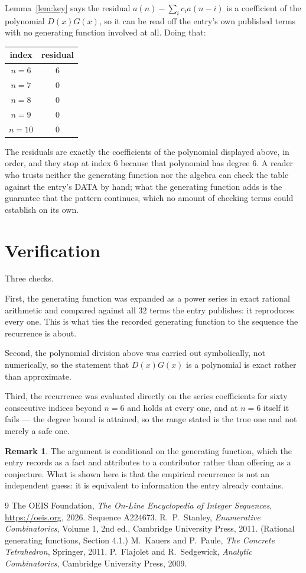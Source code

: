 \documentclass[11pt,a4paper]{article}
\theoremstyle{plain}
\theoremstyle{definition}
\newtheorem{remark}[theorem]{Remark}
\begin{document}
Lemma~\ref{lem:key} says the residual $a(n)-\sum_ic_ia(n-i)$ is a coefficient of the
polynomial $D(x)G(x)$, so it can be read off the entry's own published terms with no
generating function involved at all. Doing that:
\begin{center}
\begin{tabular}{cc}
index & residual \\ \hline
$n=6$ & $6$ \\
$n=7$ & $0$ \\
$n=8$ & $0$ \\
$n=9$ & $0$ \\
$n=10$ & $0$
\end{tabular}
\end{center}
The residuals are exactly the coefficients of the polynomial displayed above, in order, and
they stop at index $6$ because that polynomial has degree $6$. A reader who trusts
neither the generating function nor the algebra can check the table against the entry's DATA
by hand; what the generating function adds is the guarantee that the pattern continues, which
no amount of checking terms could establish on its own.

\section{Verification}

Three checks.

First, the generating function was expanded as a power series in exact rational arithmetic and
compared against all $32$ terms the entry publishes: it reproduces every one. This is
what ties the recorded generating function to the sequence the recurrence is about.

Second, the polynomial division above was carried out symbolically, not numerically, so the
statement that $D(x)G(x)$ is a polynomial is exact rather than approximate.

Third, the recurrence was evaluated directly on the series coefficients for sixty consecutive
indices beyond $n=6$ and holds at every one, and at $n=6$ itself it fails --- the
degree bound is attained, so the range stated is the true one and not merely a safe one.

\begin{remark}
The argument is conditional on the generating function, which the entry records as a fact and
attributes to a contributor rather than offering as a conjecture. What is shown here is that
the empirical recurrence is not an independent guess: it is equivalent to information the
entry already contains.
\end{remark}

\begin{thebibliography}{9}
 The OEIS Foundation, \emph{The On-Line Encyclopedia of Integer
Sequences}, \url{https://oeis.org}, 2026. Sequence A224673.
 R.~P.~Stanley, \emph{Enumerative Combinatorics}, Volume 1, 2nd ed.,
Cambridge University Press, 2011. (Rational generating functions, Section 4.1.)
 M.~Kauers and P.~Paule, \emph{The Concrete Tetrahedron}, Springer, 2011.
 P.~Flajolet and R.~Sedgewick, \emph{Analytic Combinatorics}, Cambridge
University Press, 2009.
\end{thebibliography}
\end{document}
